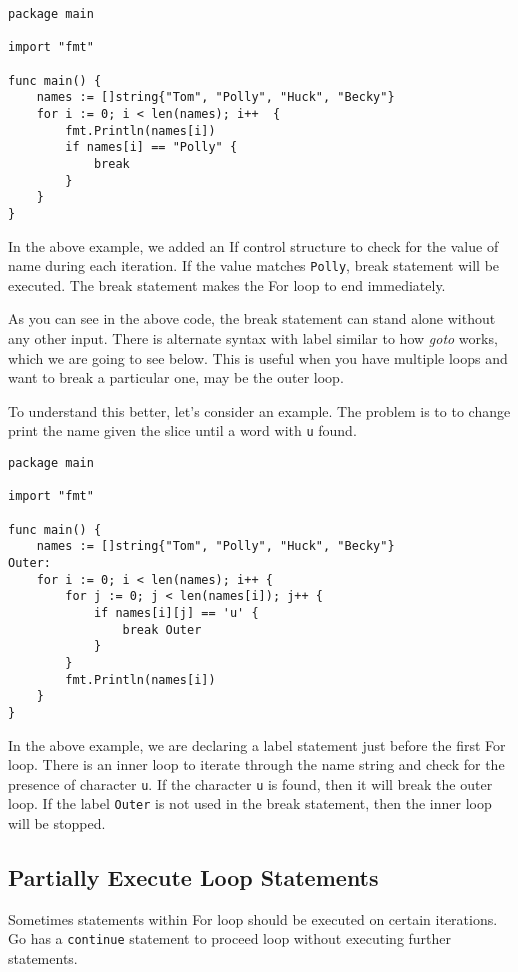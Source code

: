 \begin{lstlisting}[caption=For loop with break]
package main

import "fmt"

func main() {
    names := []string{"Tom", "Polly", "Huck", "Becky"}
    for i := 0; i < len(names); i++  {
        fmt.Println(names[i])
        if names[i] == "Polly" {
            break
        }
    }
}
\end{lstlisting}

In the above example, we added an If control structure to check for
the value of name during each iteration.  If the value
matches \texttt{Polly}, break statement will be executed.  The break
statement makes the For loop to end immediately.

As you can see in the above code, the break statement can stand alone
without any other input.  There is alternate syntax with
label similar to how \textit{goto} works, which we
are going to see below.  This is useful when you have multiple loops
and want to break a particular one, may be the outer loop.

To understand this better, let's consider an example.  The problem is
to to change print the name given the slice until a word
with \texttt{u} found.

\begin{lstlisting}[caption=For loop with break and label]
package main

import "fmt"

func main() {
    names := []string{"Tom", "Polly", "Huck", "Becky"}
Outer:
    for i := 0; i < len(names); i++ {
        for j := 0; j < len(names[i]); j++ {
            if names[i][j] == 'u' {
                break Outer
            }
        }
        fmt.Println(names[i])
    }
}
\end{lstlisting}

In the above example, we are declaring a label statement just before
the first For loop.  There is an inner loop to iterate through the
name string and check for the presence of character \texttt{u}.  If
the character \texttt{u} is found, then it will break the outer loop.
If the label \texttt{Outer} is not used in the break statement, then
the inner loop will be stopped.

\subsection{Partially Execute Loop Statements}

Sometimes statements within For loop should be executed on certain
iterations.  Go has a \texttt{continue} statement to
proceed loop without executing further statements.

